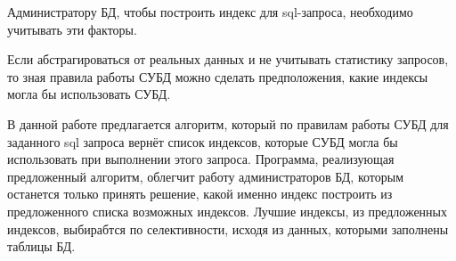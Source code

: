 Администратору БД, чтобы построить индекс для sql-запроса, необходимо учитывать эти факторы.

Если абстрагироваться от реальных данных и не учитывать статистику запросов, то зная правила работы СУБД можно сделать предположения, какие индексы могла бы использовать СУБД. 

В данной работе предлагается алгоритм, который по правилам работы СУБД для заданного sql запроса вернёт список индексов, которые СУБД могла бы использовать при выполнении этого запроса. Программа, реализующая предложенный алгоритм, облегчит работу администраторов БД, которым останется только принять решение, какой именно индекс построить из предложенного списка возможных индексов. Лучшие индексы, из предложенных индексов, выбирабтся по селективности, исходя из данных, которыми заполнены таблицы БД.
